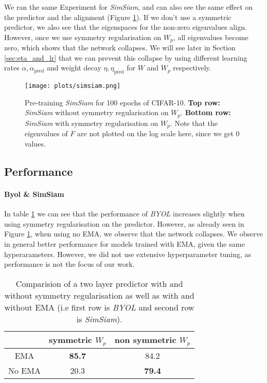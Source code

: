 We ran the same Experiment for \emph{SimSiam}, and can also see the same effect on the predictor and the alignment (Figure \ref{fig:SimSiam_eig}). If we don't use a symmetric predictor, we also see that the eigenspaces for the non-zero eigenvalues align. However, once we use symmetry regularisation on $W_p$, all eigenvalues become zero, which shows that the network collapses. We will see later in Section \ref{sec:eta_and_lr} that we can prevent this collapse by using different learning rates $\alpha, \alpha_{\text{pred}}$ and weight decay $\eta, \eta_{\text{pred}}$ for $W$ and $W_p$ respectively.

\begin{figure}[h]
    \centering
    \texttt{[image: plots/simsiam.png]}
    \caption{Pre-training \emph{SimSiam} for 100 epochs of CIFAR-10. \textbf{Top row:} \emph{SimSiam} without symmetry regularisation on $W_p$. \textbf{Bottom row:} \emph{SimSiam} with symmetry regularisation on $W_p$. Note that the eigenvalues of $F$ are not plotted on the log scale here, since we get 0 values.}
    \label{fig:SimSiam_eig}
\end{figure}

\subsection{Performance}
\label{sec:performance}
\paragraph{Byol \& SimSiam}
In table \ref{tab:two_layer} we can see that the performance of \emph{BYOL} increases slightly when using symmetry regularisation on the predictor. However, as already seen in Figure \ref{fig:SimSiam_eig}, when using no EMA, we observe that the network collapses. We observe in general better performance for models trained with EMA, given the same hyperarameters. However, we did not use extensive hyperparameter tuning, as performance is not the focus of our work. 

\begin{table}[h]
    \centering
    \begin{tabular}{c||c|c}
         &  symmetric $W_p$ & non symmetric $W_p$\\
         \hline
         EMA &  \textbf{85.7} & 84.2\\
         \hline
         No EMA & 20.3 & \textbf{79.4}  
    \end{tabular}
    \caption{Comparision of a two layer predictor with and without symmetry regularisation as well as with and without EMA (i.e first row is \emph{BYOL} and second row is \emph{SimSiam}). }
    \label{tab:two_layer}
\end{table}

